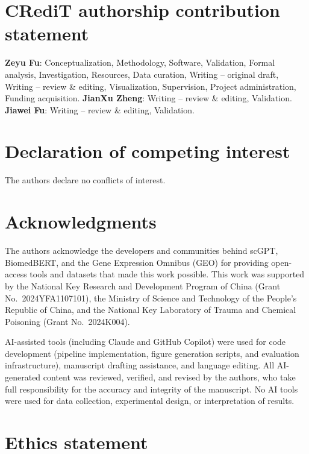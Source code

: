 \documentclass[preprint,review,12pt]{elsarticle}
\begin{document}
\linenumbers



\section*{CRediT authorship contribution statement}

\textbf{Zeyu Fu}: Conceptualization, Methodology, Software, Validation, Formal analysis, Investigation, Resources, Data curation, Writing -- original draft, Writing -- review \& editing, Visualization, Supervision, Project administration, Funding acquisition.
\textbf{JianXu Zheng}: Writing -- review \& editing, Validation.
\textbf{Jiawei Fu}: Writing -- review \& editing, Validation.

\section*{Declaration of competing interest}

The authors declare no conflicts of interest.

\section*{Acknowledgments}

The authors acknowledge the developers and communities behind scGPT, BiomedBERT, and the Gene Expression Omnibus (GEO) for providing open-access tools and datasets that made this work possible. This work was supported by the National Key Research and Development Program of China (Grant No.~2024YFA1107101), the Ministry of Science and Technology of the People's Republic of China, and the National Key Laboratory of Trauma and Chemical Poisoning (Grant No.~2024K004).

AI-assisted tools (including Claude and GitHub Copilot) were used for code development (pipeline implementation, figure generation scripts, and evaluation infrastructure), manuscript drafting assistance, and language editing. All AI-generated content was reviewed, verified, and revised by the authors, who take full responsibility for the accuracy and integrity of the manuscript. No AI tools were used for data collection, experimental design, or interpretation of results.

\section*{Ethics statement}
\end{document}
